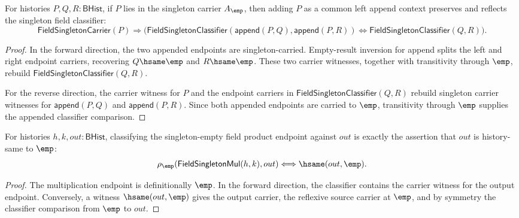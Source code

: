 \begin{theorem}
\label{thm:field-singleton-classifier-append-left-cancel}
For histories $P,Q,R:\mathsf{BHist}$, if $P$ lies in the singleton carrier
$A_{\emp}$, then adding $P$ as a common left append context preserves and
reflects the singleton field classifier:
$$
\mathsf{FieldSingletonCarrier}(P)\Rightarrow
\bigl(
\mathsf{FieldSingletonClassifier}(\mathsf{append}(P,Q),\mathsf{append}(P,R))
\Longleftrightarrow
\mathsf{FieldSingletonClassifier}(Q,R)
\bigr).
$$
\end{theorem}
\begin{proof}
In the forward direction, the two appended endpoints are singleton-carried.
Empty-result inversion for append splits the left and right endpoint carriers,
recovering $Q\hsame\emp$ and $R\hsame\emp$. These two carrier witnesses,
together with transitivity through $\emp$, rebuild
$\mathsf{FieldSingletonClassifier}(Q,R)$.

For the reverse direction, the carrier witness for $P$ and the endpoint
carriers in $\mathsf{FieldSingletonClassifier}(Q,R)$ rebuild singleton carrier
witnesses for $\mathsf{append}(P,Q)$ and $\mathsf{append}(P,R)$. Since both
appended endpoints are carried to $\emp$, transitivity through $\emp$ supplies
the appended classifier comparison.
\end{proof}

\begin{theorem}
\label{thm:field-singleton-classifier-mul-empty-endpoint}
For histories $h,k,out:\mathsf{BHist}$, classifying the singleton-empty field
product endpoint against $out$ is exactly the assertion that $out$ is
history-same to $\emp$:
$$
\rho_{\emp}(\mathsf{FieldSingletonMul}(h,k),out)
\Longleftrightarrow
\hsame(out,\emp).
$$
\end{theorem}
\begin{proof}
The multiplication endpoint is definitionally $\emp$. In the forward
direction, the classifier contains the carrier witness for the output
endpoint. Conversely, a witness $\hsame(out,\emp)$ gives the output carrier,
the reflexive source carrier at $\emp$, and by symmetry the classifier
comparison from $\emp$ to $out$.
\end{proof}

